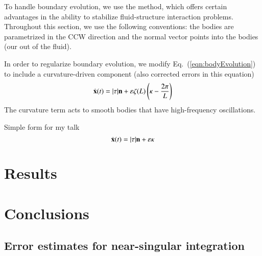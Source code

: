 \documentclass[preprint, 10pt]{elsarticle}
\begin{document}
To handle boundary evolution, we use the {\thL}    method, which offers certain advantages in the ability to stabilize fluid-structure interaction problems. Throughout this section, we use the following conventions: the bodies are parametrized in the CCW direction and the normal vector points into the bodies (our out of the fluid).


In order to regularize boundary evolution, we modify
Eq.~(\ref{eqn:bodyEvolution}) to include a curvature-driven component
(also corrected errors in this equation)
\begin{equation}
\dot{{\mathbf{x}}}(t) = \lvert \tau \rvert {\mathbf{n}} + \varepsilon \zeta(L) \left(\kappa - \frac{2 \pi}{L} \right)
\end{equation}
The curvature term acts to smooth bodies that have high-frequency oscillations.

Simple form for my talk
\begin{equation}
\dot{{\mathbf{x}}}(t) = \lvert \tau \rvert {\mathbf{n}} + \varepsilon \kappa
\end{equation}




\section{Results\label{s:results}} 

\section{Conclusions\label{s:conclusions}}


\begin{appendices}
\section{Error estimates for near-singular integration \label{A:AppendixA}} 
\end{appendices}


 

\end{document}
